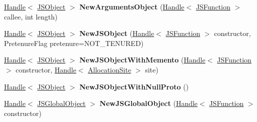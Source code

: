 \begin{DoxyCompactItemize}
\item 
\hyperlink{classv8_1_1internal_1_1_handle}{Handle}$<$ \hyperlink{classv8_1_1internal_1_1_j_s_object}{J\+S\+Object} $>$ {\bfseries New\+Arguments\+Object} (\hyperlink{classv8_1_1internal_1_1_handle}{Handle}$<$ \hyperlink{classv8_1_1internal_1_1_j_s_function}{J\+S\+Function} $>$ callee, int length)\hypertarget{classv8_1_1internal_1_1_factory_aa3912ca0745f19250298156de9d8b455}{}\label{classv8_1_1internal_1_1_factory_aa3912ca0745f19250298156de9d8b455}

\item 
\hyperlink{classv8_1_1internal_1_1_handle}{Handle}$<$ \hyperlink{classv8_1_1internal_1_1_j_s_object}{J\+S\+Object} $>$ {\bfseries New\+J\+S\+Object} (\hyperlink{classv8_1_1internal_1_1_handle}{Handle}$<$ \hyperlink{classv8_1_1internal_1_1_j_s_function}{J\+S\+Function} $>$ constructor, Pretenure\+Flag pretenure=N\+O\+T\+\_\+\+T\+E\+N\+U\+R\+ED)\hypertarget{classv8_1_1internal_1_1_factory_a76f8b4906c8d7d5b13e4894f7e9023b9}{}\label{classv8_1_1internal_1_1_factory_a76f8b4906c8d7d5b13e4894f7e9023b9}

\item 
\hyperlink{classv8_1_1internal_1_1_handle}{Handle}$<$ \hyperlink{classv8_1_1internal_1_1_j_s_object}{J\+S\+Object} $>$ {\bfseries New\+J\+S\+Object\+With\+Memento} (\hyperlink{classv8_1_1internal_1_1_handle}{Handle}$<$ \hyperlink{classv8_1_1internal_1_1_j_s_function}{J\+S\+Function} $>$ constructor, \hyperlink{classv8_1_1internal_1_1_handle}{Handle}$<$ \hyperlink{classv8_1_1internal_1_1_allocation_site}{Allocation\+Site} $>$ site)\hypertarget{classv8_1_1internal_1_1_factory_a7b9b31f8c9a96a94b70f215e920002b8}{}\label{classv8_1_1internal_1_1_factory_a7b9b31f8c9a96a94b70f215e920002b8}

\item 
\hyperlink{classv8_1_1internal_1_1_handle}{Handle}$<$ \hyperlink{classv8_1_1internal_1_1_j_s_object}{J\+S\+Object} $>$ {\bfseries New\+J\+S\+Object\+With\+Null\+Proto} ()\hypertarget{classv8_1_1internal_1_1_factory_a35f86baf123dfbe57824f027ae1b0999}{}\label{classv8_1_1internal_1_1_factory_a35f86baf123dfbe57824f027ae1b0999}

\item 
\hyperlink{classv8_1_1internal_1_1_handle}{Handle}$<$ \hyperlink{classv8_1_1internal_1_1_j_s_global_object}{J\+S\+Global\+Object} $>$ {\bfseries New\+J\+S\+Global\+Object} (\hyperlink{classv8_1_1internal_1_1_handle}{Handle}$<$ \hyperlink{classv8_1_1internal_1_1_j_s_function}{J\+S\+Function} $>$ constructor)\hypertarget{classv8_1_1internal_1_1_factory_adaab8d7f594c992eb74050e0313f9d41}{}\label{classv8_1_1internal_1_1_factory_adaab8d7f594c992eb74050e0313f9d41}


\end{DoxyCompactItemize}
